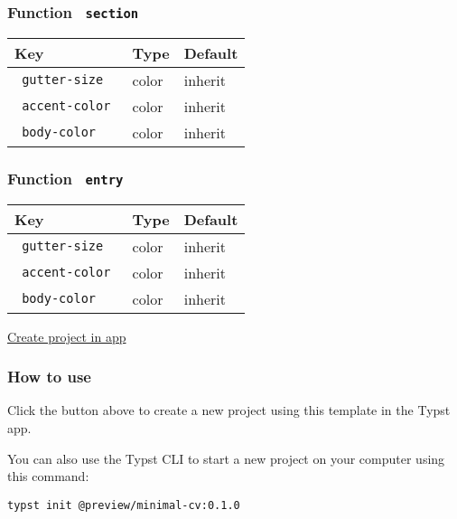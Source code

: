 \subsubsection{\texorpdfstring{Function
\texttt{\ section\ }}{Function  section }}\label{function-section}

\begin{longtable}[]{@{}lll@{}}
\toprule\noalign{}
Key & Type & Default \\
\midrule\noalign{}
\endhead
\bottomrule\noalign{}
\endlastfoot
\texttt{\ gutter-size\ } & color & inherit \\
\texttt{\ accent-color\ } & color & inherit \\
\texttt{\ body-color\ } & color & inherit \\
\end{longtable}

\subsubsection{\texorpdfstring{Function
\texttt{\ entry\ }}{Function  entry }}\label{function-entry}

\begin{longtable}[]{@{}lll@{}}
\toprule\noalign{}
Key & Type & Default \\
\midrule\noalign{}
\endhead
\bottomrule\noalign{}
\endlastfoot
\texttt{\ gutter-size\ } & color & inherit \\
\texttt{\ accent-color\ } & color & inherit \\
\texttt{\ body-color\ } & color & inherit \\
\end{longtable}

\href{/app?template=minimal-cv&version=0.1.0}{Create project in app}

\subsubsection{How to use}\label{how-to-use}

Click the button above to create a new project using this template in
the Typst app.

You can also use the Typst CLI to start a new project on your computer
using this command:

\begin{verbatim}
typst init @preview/minimal-cv:0.1.0
\end{verbatim}



